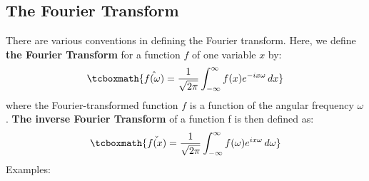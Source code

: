 \documentclass{article}
\begin{document}
\subsection{The Fourier Transform}
There are various conventions in defining the Fourier transform. Here, we define \textbf{the Fourier Transform} for a function $f$ of one variable $x$ by: 
\begin{equation}
	\tcboxmath {\hat{f(\omega)} = \frac{1}{\sqrt{2\pi}} \int_{-\infty}^{\infty}f(x)e^{-ix\omega} \, dx}
\end{equation}
where the Fourier-transformed function $f$ is a function of the angular frequency $\omega$. 
\newline
\vspace{0,1cm}
\newline
\textbf{The inverse Fourier Transform} of a function f is then defined as: 
\begin{equation}
	\tcboxmath {\check{f(x)} = \frac{1}{\sqrt{2\pi}} \int_{-\infty}^{\infty}f(\omega)e^{ix\omega} \, d\omega}
\end{equation}
Examples:
\end{document}
